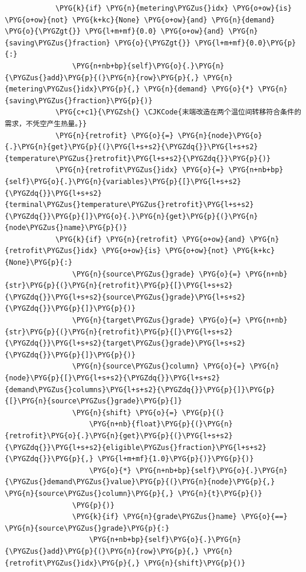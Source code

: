 \begin{Verbatim}
            \PYG{k}{if} \PYG{n}{metering\PYGZus{}idx} \PYG{o+ow}{is} \PYG{o+ow}{not} \PYG{k+kc}{None} \PYG{o+ow}{and} \PYG{n}{demand} \PYG{o}{\PYGZgt{}} \PYG{l+m+mf}{0.0} \PYG{o+ow}{and} \PYG{n}{saving\PYGZus{}fraction} \PYG{o}{\PYGZgt{}} \PYG{l+m+mf}{0.0}\PYG{p}{:}
                \PYG{n+nb+bp}{self}\PYG{o}{.}\PYG{n}{\PYGZus{}add}\PYG{p}{(}\PYG{n}{row}\PYG{p}{,} \PYG{n}{metering\PYGZus{}idx}\PYG{p}{,} \PYG{n}{demand} \PYG{o}{*} \PYG{n}{saving\PYGZus{}fraction}\PYG{p}{)}
            \PYG{c+c1}{\PYGZsh{} \CJKCode{末端改造在两个温位间转移符合条件的需求，不凭空产生热量。}}
            \PYG{n}{retrofit} \PYG{o}{=} \PYG{n}{node}\PYG{o}{.}\PYG{n}{get}\PYG{p}{(}\PYG{l+s+s2}{\PYGZdq{}}\PYG{l+s+s2}{temperature\PYGZus{}retrofit}\PYG{l+s+s2}{\PYGZdq{}}\PYG{p}{)}
            \PYG{n}{retrofit\PYGZus{}idx} \PYG{o}{=} \PYG{n+nb+bp}{self}\PYG{o}{.}\PYG{n}{variables}\PYG{p}{[}\PYG{l+s+s2}{\PYGZdq{}}\PYG{l+s+s2}{terminal\PYGZus{}temperature\PYGZus{}retrofit}\PYG{l+s+s2}{\PYGZdq{}}\PYG{p}{]}\PYG{o}{.}\PYG{n}{get}\PYG{p}{(}\PYG{n}{node\PYGZus{}name}\PYG{p}{)}
            \PYG{k}{if} \PYG{n}{retrofit} \PYG{o+ow}{and} \PYG{n}{retrofit\PYGZus{}idx} \PYG{o+ow}{is} \PYG{o+ow}{not} \PYG{k+kc}{None}\PYG{p}{:}
                \PYG{n}{source\PYGZus{}grade} \PYG{o}{=} \PYG{n+nb}{str}\PYG{p}{(}\PYG{n}{retrofit}\PYG{p}{[}\PYG{l+s+s2}{\PYGZdq{}}\PYG{l+s+s2}{source\PYGZus{}grade}\PYG{l+s+s2}{\PYGZdq{}}\PYG{p}{]}\PYG{p}{)}
                \PYG{n}{target\PYGZus{}grade} \PYG{o}{=} \PYG{n+nb}{str}\PYG{p}{(}\PYG{n}{retrofit}\PYG{p}{[}\PYG{l+s+s2}{\PYGZdq{}}\PYG{l+s+s2}{target\PYGZus{}grade}\PYG{l+s+s2}{\PYGZdq{}}\PYG{p}{]}\PYG{p}{)}
                \PYG{n}{source\PYGZus{}column} \PYG{o}{=} \PYG{n}{node}\PYG{p}{[}\PYG{l+s+s2}{\PYGZdq{}}\PYG{l+s+s2}{demand\PYGZus{}columns}\PYG{l+s+s2}{\PYGZdq{}}\PYG{p}{]}\PYG{p}{[}\PYG{n}{source\PYGZus{}grade}\PYG{p}{]}
                \PYG{n}{shift} \PYG{o}{=} \PYG{p}{(}
                    \PYG{n+nb}{float}\PYG{p}{(}\PYG{n}{retrofit}\PYG{o}{.}\PYG{n}{get}\PYG{p}{(}\PYG{l+s+s2}{\PYGZdq{}}\PYG{l+s+s2}{eligible\PYGZus{}fraction}\PYG{l+s+s2}{\PYGZdq{}}\PYG{p}{,} \PYG{l+m+mf}{1.0}\PYG{p}{)}\PYG{p}{)}
                    \PYG{o}{*} \PYG{n+nb+bp}{self}\PYG{o}{.}\PYG{n}{\PYGZus{}demand\PYGZus{}value}\PYG{p}{(}\PYG{n}{node}\PYG{p}{,} \PYG{n}{source\PYGZus{}column}\PYG{p}{,} \PYG{n}{t}\PYG{p}{)}
                \PYG{p}{)}
                \PYG{k}{if} \PYG{n}{grade\PYGZus{}name} \PYG{o}{==} \PYG{n}{source\PYGZus{}grade}\PYG{p}{:}
                    \PYG{n+nb+bp}{self}\PYG{o}{.}\PYG{n}{\PYGZus{}add}\PYG{p}{(}\PYG{n}{row}\PYG{p}{,} \PYG{n}{retrofit\PYGZus{}idx}\PYG{p}{,} \PYG{n}{shift}\PYG{p}{)}

\end{Verbatim}
